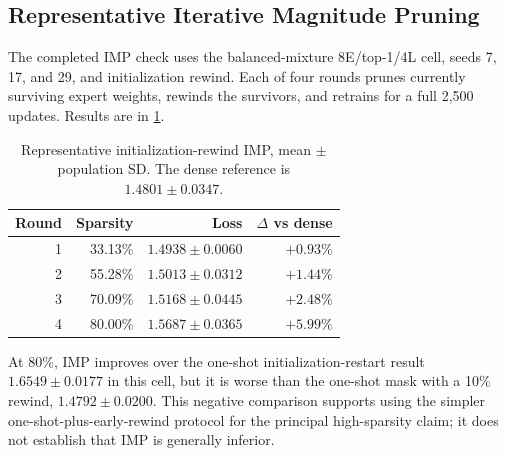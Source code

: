 \documentclass{article}
\begin{document}
\subsection{Representative Iterative Magnitude Pruning}

The completed IMP check uses the balanced-mixture 8E/top-1/4L cell, seeds 7,
17, and 29, and initialization rewind. Each of four rounds prunes currently
surviving expert weights, rewinds the survivors, and retrains for a full 2,500
updates. Results are in \cref{tab:app_imp}.

\begin{table}[t]
\centering
\scriptsize
\caption{Representative initialization-rewind IMP, mean $\pm$ population SD.
The dense reference is $1.4801\pm0.0347$.}
\label{tab:app_imp}
\begin{tabular}{@{}rrrr@{}}
\toprule
Round & Sparsity & Loss & $\Delta$ vs dense \\
\midrule
1 & 33.13\% & $1.4938\pm0.0060$ & $+0.93\%$ \\
2 & 55.28\% & $1.5013\pm0.0312$ & $+1.44\%$ \\
3 & 70.09\% & $1.5168\pm0.0445$ & $+2.48\%$ \\
4 & 80.00\% & $1.5687\pm0.0365$ & $+5.99\%$ \\
\bottomrule
\end{tabular}
\end{table}

At 80\%, IMP improves over the one-shot initialization-restart result
$1.6549\pm0.0177$ in this cell, but it is worse than the one-shot mask with a
10\% rewind, $1.4792\pm0.0200$. This negative comparison supports using the
simpler one-shot-plus-early-rewind protocol for the principal high-sparsity
claim; it does not establish that IMP is generally inferior.
\end{document}
